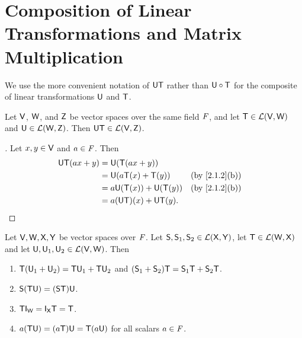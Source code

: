 \section{Composition of Linear Transformations and Matrix Multiplication}\label{sec:2.3}

\begin{note}
  We use the more convenient notation of \(\mathsf{U} \mathsf{T}\) rather than \(\mathsf{U} \circ \mathsf{T}\) for the composite of linear transformations \(\mathsf{U}\) and \(\mathsf{T}\).
\end{note}

\begin{thm}\label{2.9}
  Let \(\mathsf{V}\), \(\mathsf{W}\), and \(\mathsf{Z}\) be vector spaces over the same field \(\mathit{F}\), and let \(\mathsf{T} \in \mathcal{L}(\mathsf{V}, \mathsf{W})\) and \(\mathsf{U} \in \mathcal{L}(\mathsf{W}, \mathsf{Z})\).
  Then \(\mathsf{U} \mathsf{T} \in \mathcal{L}(\mathsf{V}, \mathsf{Z})\).
\end{thm}

\begin{proof}[]
  Let \(x, y \in \mathsf{V}\) and \(a \in \mathit{F}\).
  Then
  \begin{align*}
    \U \T(ax + y) & = \U(\T(ax + y))                              \\
                  & = \U(a \T(x) + \T(y))      &  & \by{2.1.2}[b] \\
                  & = a \U(\T(x)) + \U(\T(y))  &  & \by{2.1.2}[b] \\
                  & = a (\U \T)(x) + \U \T(y).
  \end{align*}
\end{proof}

\begin{thm}\label{2.10}
  Let \(\mathsf{V}, \mathsf{W}, \mathsf{X}, \mathsf{Y}\) be vector spaces over \(\mathit{F}\).
  Let \(\mathsf{S}, \mathsf{S}_1, \mathsf{S}_2 \in \mathcal{L}(\mathsf{X}, \mathsf{Y})\), let \(\mathsf{T} \in \mathcal{L}(\mathsf{W}, \mathsf{X})\) and let \(\mathsf{U}, \mathsf{U}_1, \mathsf{U}_2 \in \mathcal{L}(\mathsf{V}, \mathsf{W})\).
  Then
  \begin{enumerate}
    \item \(\mathsf{T}(\mathsf{U}_1 + \mathsf{U}_2) = \mathsf{T} \mathsf{U}_1 + \mathsf{T} \mathsf{U}_2\) and \((\mathsf{S}_1 + \mathsf{S}_2) \mathsf{T} = \mathsf{S}_1 \mathsf{T} + \mathsf{S}_2 \mathsf{T}\).
    \item \(\mathsf{S} (\mathsf{T} \mathsf{U}) = (\mathsf{S} \mathsf{T}) \mathsf{U}\).
    \item \(\T \IT[\W] = \IT[\vs{X}] \T = \T\).
    \item \(a(\mathsf{T} \mathsf{U}) = (a \mathsf{T}) \mathsf{U} = \mathsf{T} (a \mathsf{U})\) for all scalars \(a \in \mathit{F}\).
  \end{enumerate}
\end{thm}

